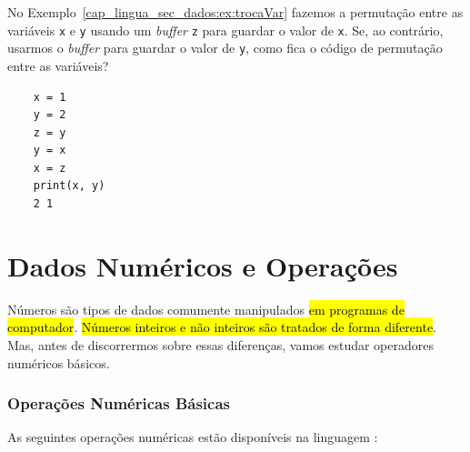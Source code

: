 \begin{exer}
  No Exemplo~\ref{cap_lingua_sec_dados:ex:trocaVar} fazemos a permutação entre as variáveis \lstinline+x+ e \lstinline+y+ usando um {\it buffer} \lstinline+z+ para guardar o valor de \lstinline+x+. Se, ao contrário, usarmos o {\it buffer} para guardar o valor de \lstinline+y+, como fica o código de permutação entre as variáveis?
\end{exer}
\begin{resp}
  \begin{lstlisting}
    x = 1
    y = 2
    z = y
    y = x
    x = z
    print(x, y)
    2 1
  \end{lstlisting}
\end{resp}

\section{Dados Numéricos e Operações}\label{cap_lingua_sec_numop}

Números são tipos de dados comumente manipulados \hl{em programas de computador}. \hl{Números inteiros e não inteiros são tratados de forma diferente}. Mas, antes de discorrermos sobre essas diferenças, vamos estudar operadores numéricos básicos.

\subsubsection{Operações Numéricas Básicas}

As seguintes operações numéricas estão disponíveis na linguagem {\python}:

